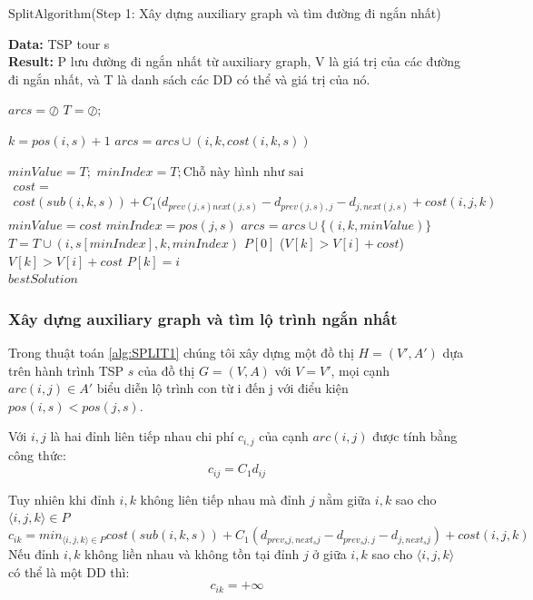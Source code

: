 \documentclass[a4paper,12pt]{report}
\begin{document}
\begin{algorithm}[H]
\caption{$\text{SplitAlgorithm}$(Step 1: Xây dựng auxiliary graph và tìm đường đi ngắn nhất)}
\textbf{Data:} TSP tour s\\
\textbf{Result:} P lưu đường đi ngắn nhất từ auxiliary graph, V là giá trị của các đường đi ngắn nhất, và T là danh sách các DD có thể và giá trị của nó.
\begin{algorithmic}[1]
\State $arcs=\oslash$
\State $T=\oslash;$

\State $k=pos(i,s)+1$
\State $arcs=arcs \cup (i,k,cost(i,k,s)) $
\EndFor
{}

\State $minValue=T;$
\State $minIndex=T;\text{Chỗ này hình như sai}$
\State $\begin{array}{l}cost = \\ cost(sub(i,k,s))+C_1(d_{prev(j,s)next(j,s)}-d_{prev(j,s),j}-d_{j,next(j,s)}+cost(i,j,k) \end{array}$
\State $minValue=cost$
\State $minIndex=pos(j,s)$
\EndIf
\EndIf
\EndFor
\State $arcs=arcs \cup \{(i,k,minValue)\}$
\State $T=T\cup{(i,s[minIndex],k,minIndex)}$
\EndIf
\EndFor
\EndFor
\State $P[0]$
\If($V[k] > V[i]+cost$)
\State $V[k]>V[i]+cost$
\State $P[k]=i$
\EndIf
\EndFor
\EndFor\\
\Return $bestSolution$
\end{algorithmic}
\label{alg:SPLIT1}
\end{algorithm}
\subsubsection{Xây dựng auxiliary graph và tìm lộ trình ngắn nhất}
Trong thuật toán \ref{alg:SPLIT1} chúng tôi xây dựng một đồ thị $H=(V',A')$ dựa trên hành trình TSP $s$ của đồ thị $G=(V,A)$ với $V=V'$, mọi cạnh $arc(i,j) \in A'$ biểu diễn lộ trình con từ i đến j với điểu kiện $pos(i,s)<pos(j,s)$.

Với $i,j$ là hai đỉnh liên tiếp nhau chi phí $c_{i,j}$ của cạnh $arc(i,j)$ được tính bằng công thức:
$$c_{ij}=C_1d_{ij}$$ 

Tuy nhiên khi đỉnh $i,k$ không liên tiếp nhau mà đỉnh $j$ nằm giữa $i,k$ sao cho $\langle i,j,k \rangle \in P$
$$
c_{ik}=min_{\langle i,j,k \rangle \in P} cost(sub(i,k,s))+C_1(d_{prev_sj,next_sj}-d_{prev_sj,j}-d_{j,next_sj})+cost(i,j,k)
$$
Nếu đỉnh $i,k$ không liền nhau và không tồn tại đỉnh $j$ ở giữa $i,k$ sao cho $\langle i,j,k \rangle$ có thể là một DD thì:
$$c_{ik}=+\infty$$
\end{document}
